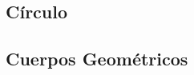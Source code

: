 \documentclass[12pt,addpoints,answers]{repaso}
\begin{document}
\begin{questions}
	\subsection*{Círculo}

	\subsection*{Cuerpos Geométricos}


\end{questions}
\end{document}
